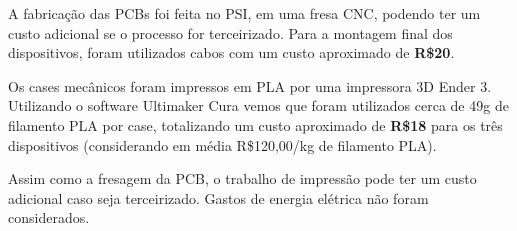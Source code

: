 \documentclass[../monografia.tex]{subfiles}
\begin{document}
A fabricação das PCBs foi feita no PSI, em uma fresa CNC, podendo ter um custo adicional se o processo for terceirizado. Para a montagem final dos dispositivos, foram utilizados cabos com um custo aproximado de \textbf{R\$20}. 

Os cases mecânicos foram impressos em PLA por uma impressora 3D Ender 3. Utilizando o software Ultimaker Cura\cite{cura} vemos que foram utilizados cerca de 49g de filamento PLA por case, totalizando um custo aproximado de \textbf{R\$18} para os três dispositivos (considerando em média R\$120,00/kg de filamento PLA). 

Assim como a fresagem da PCB, o trabalho de impressão pode ter um custo adicional caso seja terceirizado. Gastos de energia elétrica não foram considerados. 
\end{document}
